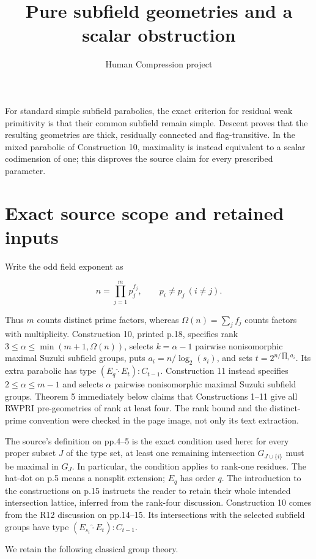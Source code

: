 \documentclass[11pt,a4paper]{article}
\title{Pure subfield geometries and a scalar obstruction}
\author{Human Compression project}\date{}
\begin{document}
\maketitle
For standard simple subfield parabolics, the exact criterion for
residual weak primitivity is that their common subfield remain simple.
Descent proves that the resulting geometries are thick, residually
connected and flag-transitive. In the mixed parabolic of Construction
10, maximality is instead equivalent to a scalar codimension of one;
this disproves the source claim for every prescribed parameter.

\section{Exact source scope and retained
inputs}\label{exact-source-scope-and-retained-inputs}

Write the odd field exponent as

\[
 n=\prod_{j=1}^{m}p_j^{f_j},\qquad p_i\ne p_j\ (i\ne j).
\]

Thus \(m\) counts distinct prime factors, whereas
\(\Omega(n)=\sum_j f_j\) counts factors with multiplicity. Construction
10, printed p.18, specifies rank \(3\le\alpha\le\min(m+1,\Omega(n))\),
selects \(k=\alpha-1\) pairwise nonisomorphic maximal Suzuki subfield
groups, puts \(a_i=n/\log_2(s_i)\), and sets \(t=2^{n/\prod_i a_i}\).
Its extra parabolic has type \((E_q\widehat{\cdot}E_t):C_{t-1}\).
Construction 11 instead specifies \(2\le\alpha\le m-1\) and selects
\(\alpha\) pairwise nonisomorphic maximal Suzuki subfield groups.
Theorem 5 immediately below claims that Constructions 1--11 give all
RWPRI pre-geometries of rank at least four. The rank bound and the
distinct-prime convention were checked in the page image, not only its
text extraction.

The source's definition on pp.4--5 is the exact condition used here: for
every proper subset \(J\) of the type set, at least one remaining
intersection \(G_{J\cup\{i\}}\) must be maximal in \(G_J\). In
particular, the condition applies to rank-one residues. The hat-dot on
p.5 means a nonsplit extension; \(E_q\) has order \(q\). The
introduction to the constructions on p.15 instructs the reader to retain
their whole intended intersection lattice, inferred from the rank-four
discussion. Construction 10 comes from the R12 discussion on pp.14--15.
Its intersections with the selected subfield groups have type
\((E_{s_i}\widehat{\cdot}E_t):C_{t-1}\).

We retain the following classical group theory.
\end{document}
